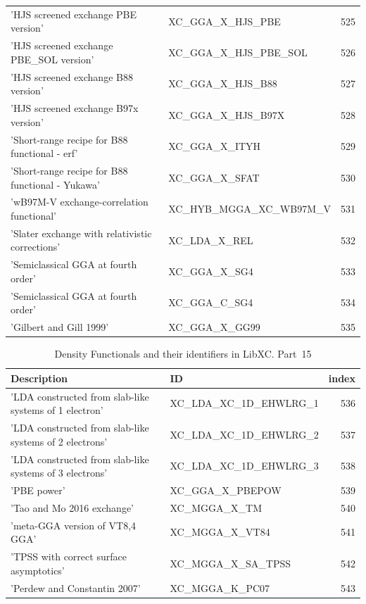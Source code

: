 \documentclass[final,12pt]{article}
\begin{document}
{{{{{{\begin{table}[!h]
\begin{center}
\begin{tabular}{llr}
  'HJS screened exchange PBE version' & XC\_GGA\_X\_HJS\_PBE  &525\\
  'HJS screened exchange PBE\_SOL version' & XC\_GGA\_X\_HJS\_PBE\_SOL  &526\\
  'HJS screened exchange B88 version' & XC\_GGA\_X\_HJS\_B88  &527\\
  'HJS screened exchange B97x version' & XC\_GGA\_X\_HJS\_B97X  &528\\
  'Short-range recipe for B88 functional - erf' & XC\_GGA\_X\_ITYH  &529\\
  'Short-range recipe for B88 functional - Yukawa' & XC\_GGA\_X\_SFAT  &530\\
  'wB97M-V exchange-correlation functional' & XC\_HYB\_MGGA\_XC\_WB97M\_V  &531\\
  'Slater exchange with relativistic corrections' & XC\_LDA\_X\_REL  &532\\
  'Semiclassical GGA at fourth order' & XC\_GGA\_X\_SG4  &533\\
  'Semiclassical GGA at fourth order' & XC\_GGA\_C\_SG4  &534\\
  'Gilbert and Gill 1999' & XC\_GGA\_X\_GG99  &535\\
\end{tabular}
\end{center}
\end{table}

\begin{table}[!h]
\caption{Density Functionals and their identifiers in LibXC. Part~15}
\begin{center}
\begin{tabular}{llr}
\hline
\hline
Description & ID & index\\
\hline
  'LDA constructed from slab-like systems of 1 electron' & XC\_LDA\_XC\_1D\_EHWLRG\_1  &536\\
  'LDA constructed from slab-like systems of 2 electrons' & XC\_LDA\_XC\_1D\_EHWLRG\_2  &537\\
  'LDA constructed from slab-like systems of 3 electrons' & XC\_LDA\_XC\_1D\_EHWLRG\_3  &538\\
  'PBE power' & XC\_GGA\_X\_PBEPOW  &539\\
  'Tao and Mo 2016 exchange' & XC\_MGGA\_X\_TM  &540\\
  'meta-GGA version of VT{8,4} GGA' & XC\_MGGA\_X\_VT84  &541\\
  'TPSS with correct surface asymptotics' & XC\_MGGA\_X\_SA\_TPSS  &542\\
  'Perdew and Constantin 2007' & XC\_MGGA\_K\_PC07  &543\\
\end{tabular}
\end{center}
\end{table}

}}}}}}
\end{document}
